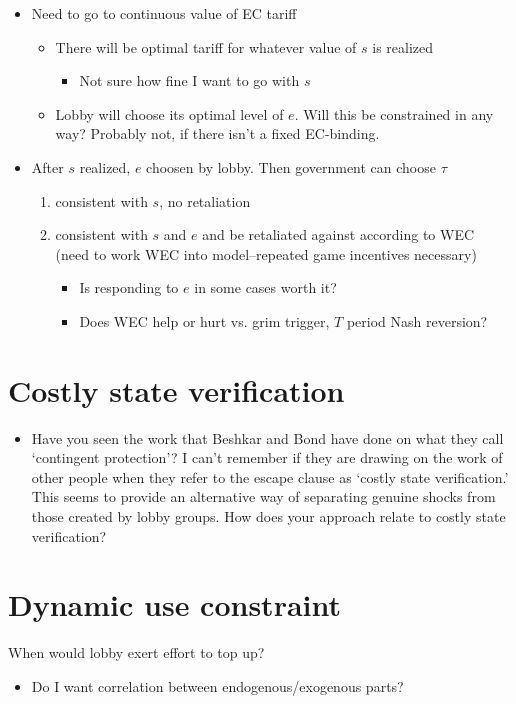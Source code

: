 \documentclass[12pt]{article}
\begin{document}
\begin{itemize}
\begin{itemize}
				\end{itemize}
			\item Need to go to continuous value of EC tariff
				\begin{itemize}
					\item There will be optimal tariff for whatever value of $s$ is realized
						\begin{itemize}
							\item Not sure how fine I want to go with $s$
						\end{itemize}
					\item Lobby will choose its optimal level of $e$. Will this be constrained in any way? Probably not, if there isn't a fixed EC-binding.
				\end{itemize}
			\item After $s$ realized, $e$ choosen by lobby. Then government can choose $\tau$
				\begin{enumerate}
					\item consistent with $s$, no retaliation
					\item consistent with $s$ and $e$ and be retaliated against according to WEC (need to work WEC into model--repeated game incentives necessary)
						\begin{itemize}
							\item Is responding to $e$ in some cases worth it?
							\item Does WEC help or hurt vs. grim trigger, $T$ period Nash reversion?
						\end{itemize}
				\end{enumerate}
		\end{itemize}


\section{Costly state verification}
		\begin{itemize}
				\item Have you seen the work that Beshkar and Bond have done on what they call `contingent protection'?  I can't remember if they are drawing on the work of other people when they refer to the escape clause as `costly state verification.'  This seems to provide an alternative way of separating genuine shocks from those created by lobby groups.  How does your approach relate to costly state verification?
		\end{itemize}


\section{Dynamic use constraint}
When would lobby exert effort to top up?
\begin{itemize}
	\item Do I want correlation between endogenous/exogenous parts? 
\end{itemize}
\end{document}
